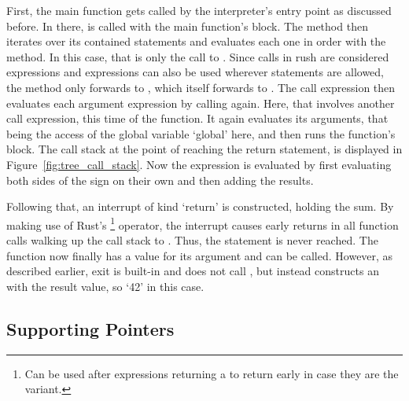 First, the main function gets called by the interpreter's entry point as discussed before.
In there,  is called with the main function's block.
The  method then iterates over its contained statements and evaluates each one in order with the  method.
In this case, that is only the call to .
Since calls in rush are considered expressions and expressions can also be used wherever statements are allowed, the  method only forwards to , which itself forwards to .
The call expression then evaluates each argument expression by calling  again.
Here, that involves another call expression, this time of the  function.
It again evaluates its arguments, that being the access of the global variable `global' here, and then runs the function's block.
The call stack at the point of reaching the return statement, is displayed in Figure~\ref{fig:tree_call_stack}.
Now the expression  is evaluated by first evaluating both sides of the \qVerb{+} sign on their own and then adding the results.

Following that, an interrupt of kind `return' is constructed, holding the sum.
By making use of Rust's \footnote{Can be used after expressions returning a  to return early in case they are the  variant.} operator, the interrupt causes early returns in all function calls walking up the call stack to .
Thus, the statement  is never reached.
The  function now finally has a value for its argument and can be called.
However, as described earlier, exit is built-in and does not call , but instead constructs an  with the result value, so `42' in this case.

\subsection{Supporting Pointers}\label{sec:tree_pointers}

